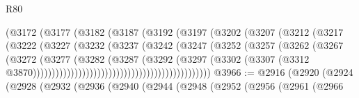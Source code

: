 \begin{lexlean}{R80}
\begin{coremodule}
                                        (@3172
                                          (@3177
                                            (@3182
                                              (@3187
                                                (@3192
                                                  (@3197
                                                    (@3202
                                                      (@3207
                                                        (@3212
                                                          (@3217
                                                            (@3222
                                                              (@3227
                                                                (@3232
                                                                  (@3237
                                                                    (@3242
                                                                      (@3247
                                                                        (@3252
                                                                          (@3257
                                                                            (@3262
                                                                              (@3267
                                                                                (@3272
                                                                                  (@3277
                                                                                    (@3282
                                                                                      (@3287
                                                                                        (@3292
                                                                                          (@3297
                                                                                            (@3302
                                                                                              (@3307
                                                                                                (@3312
                                                                                                  @3870)))))))))))))))))))))))))))))))))))))))))))))))
@3966 := @2916
    (@2920
      (@2924
        (@2928
          (@2932
            (@2936
              (@2940
                (@2944
                  (@2948
                    (@2952
                      (@2956
                        (@2961
                          (@2966

\end{coremodule}
\end{lexlean}
